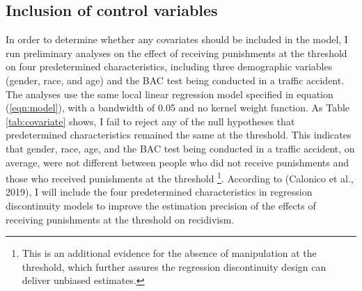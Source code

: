 \documentclass[
  11pt,
]{article}
\begin{document}
\hypertarget{inclusion-of-control-variables}{%
\subsection{Inclusion of control
variables}\label{inclusion-of-control-variables}}

In order to determine whether any covariates should be included in the
model, I run preliminary analyses on the effect of receiving punishments
at the threshold on four predetermined characteristics, including three
demographic variables (gender, race, and age) and the BAC test being
conducted in a traffic accident. The analyses use the same local linear
regression model specified in equation (\ref{eqn:model}), with a
bandwidth of 0.05 and no kernel weight function. As Table
\ref{tab:covariate} shows, I fail to reject any of the null hypotheses
that predetermined characteristics remained the same at the threshold.
This indicates that gender, race, age, and the BAC test being conducted
in a traffic accident, on average, were not different between people who
did not receive punishments and those who received punishments at the
threshold
\footnote{This is an additional evidence for the absence of manipulation at the threshold, which further assures the regression discontinuity design can deliver unbiased estimates.}.
According to (Calonico et al., 2019), I will include the four
predetermined characteristics in regression discontinuity models to
improve the estimation precision of the effects of receiving punishments
at the threshold on recidivism.

\begingroup
\renewcommand{\arraystretch}{1.3}
\end{document}
